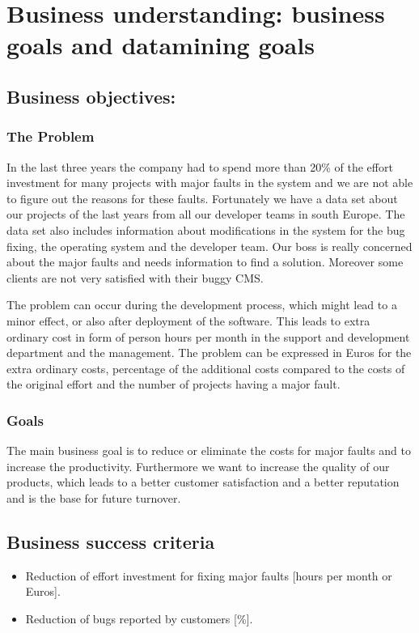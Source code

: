 \chapter{Business understanding: business goals and datamining goals}
\section{Business objectives:}
\subsection{The Problem}
In the last three years the company had to spend more than 20\% of the effort investment for many projects with major faults in the system and we are not able to figure out the reasons for these faults. Fortunately we have a data set about our projects of the last years from all our developer teams in south Europe. The data set also includes information about modifications in the system for the bug fixing, the operating system and the developer team. Our boss is really concerned about the major faults and needs information to find a solution. Moreover some clients are not very satisfied with their buggy CMS.

The problem can occur during the development process, which might lead to a minor effect, or also after deployment of the software. This leads to extra ordinary cost in form of person hours per month in the support and development department and the management. The problem can be expressed in Euros for the extra ordinary costs, percentage of the additional costs compared to the costs of the original effort and the number of projects having a major fault.

\subsection{Goals}
The main business goal is to reduce or eliminate the costs for major faults and to increase the productivity. Furthermore we want to increase the quality of our products, which leads to a better customer satisfaction and a better reputation and is the base for future turnover.

\section{Business success criteria}
\begin{itemize}
	\item Reduction of effort investment for fixing major faults [hours per month or Euros].
	\item Reduction of bugs reported by customers [\%].
	\end{itemize}

